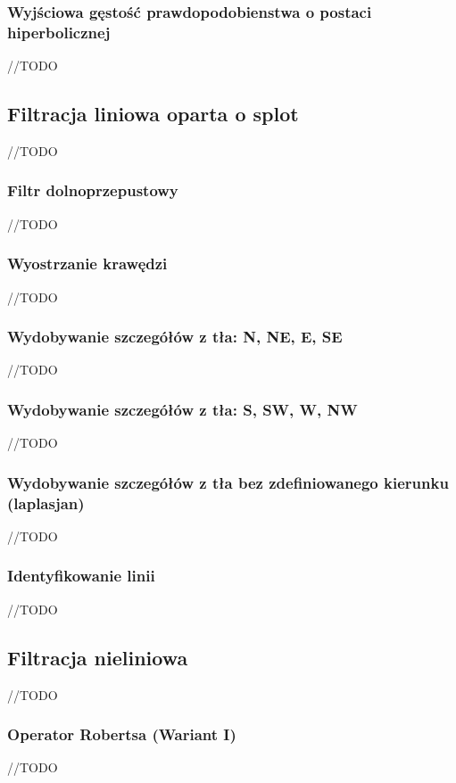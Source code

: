 \documentclass{classrep}
\begin{document}
\subsubsection{Wyjściowa gęstość prawdopodobienstwa o postaci hiperbolicznej}
//TODO

\subsection{Filtracja liniowa oparta o splot}
//TODO

\subsubsection{Filtr dolnoprzepustowy}
//TODO

\subsubsection{Wyostrzanie krawędzi}
//TODO

\subsubsection{Wydobywanie szczegółów z tła: N, NE, E, SE}
//TODO

\subsubsection{Wydobywanie szczegółów z tła: S, SW, W, NW}
//TODO

\subsubsection{Wydobywanie szczegółów z tła bez zdefiniowanego kierunku (laplasjan)}
//TODO

\subsubsection{Identyfikowanie linii}
//TODO

\subsection{Filtracja nieliniowa}
//TODO

\subsubsection{Operator Robertsa (Wariant I)}
//TODO
\end{document}
